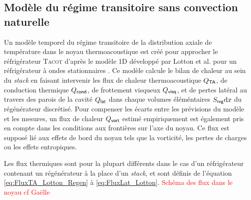 \subsection{Modèle du régime transitoire sans convection naturelle} \label{chap:ModeleTransoitoire_SansConvNat}
Un modèle temporel du régime transitoire de la distribution axiale de température dans le noyau thermoacoustique est créé pour approcher le réfrigérateur \textsc{Tacot} d'après le modèle 1D développé par Lotton et al. pour un réfrigérateur à ondes stationnaires \cite{lotton_transient_2009}. Ce modèle calcule le bilan de chaleur au sein du \textit{stack} en faisant intervenir les flux de chaleur thermoacoustique $Q_{\sf TA}$, de conduction thermique $Q_{\sf cond}$, de frottement visqueux $Q_{\sf visq}$, et de pertes latéral au travers des parois de la cavité $Q_{\sf lat}$ dans chaque volumes éléméntaires $S_{\sf reg} \mathrm{d} x$ du régénérateur discrétisé. Pour compenser les écarts entre les prévisions du modèle et les mesures, un flux de chaleur $Q_{\sf vort}$ estimé empiriquement est également pris en compte dans les conditions aux frontières sur l'axe du noyau. Ce flux est supposé lié aux effets de bord du noyau tels que la vorticité, les pertes de charges ou les effets entropiques.

Les flux thermiques sont pour la plupart différents dans le cas d'un réfrigérateur contenant un régénérateur à la place d'un \textit{stack}, et sont définis de l'équation \eqref{eq:FluxTA_Lotton_Regen} à \eqref{eq:FluxLat_Lotton}. \textcolor{red}{Schéma des flux dans le noyau cf Gaëlle}

